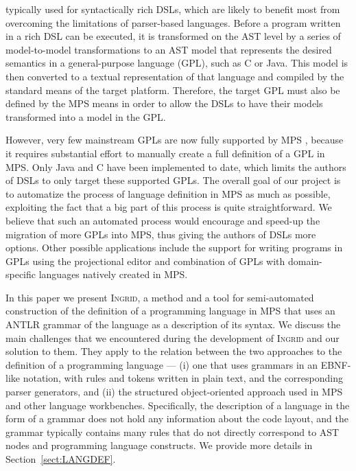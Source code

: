 
 typically used for syntactically rich DSLs, which are likely to benefit most from overcoming the limitations of parser-based languages.
Before a program written in a rich DSL can be executed, it is  transformed on the AST level by a series of model-to-model transformations to an AST model that represents the desired semantics in a general-purpose language (GPL), such as C or Java.
This model is then converted to a textual representation of that language and compiled by the standard means of the target platform.
Therefore, the target GPL must also be defined by the MPS means in order to allow the DSLs to have their models transformed into a model in the GPL.

However, very few mainstream GPLs are now fully supported by MPS , because it requires substantial effort to manually create a full definition of a GPL in MPS.
Only Java and C have been implemented to date, which limits the authors of DSLs to only target these supported GPLs.
The overall goal of our project is to automatize the process of language definition in MPS as much as possible, exploiting the fact that a big part of this process is quite straightforward.
We believe that such an automated process would encourage and speed-up the migration of more GPLs into MPS, thus giving the authors of DSLs more options.
Other possible applications include the support for writing programs in GPLs using the projectional editor and combination of GPLs with domain-specific languages natively created in MPS.

In this paper we present \textsc{Ingrid}, a method and a tool for semi-automated construction of the definition of a programming language in MPS that uses an ANTLR grammar of the language as a description of its syntax.
We discuss the main challenges that we encountered during the development of \textsc{Ingrid} and our solution to them.
They apply to the relation between the two approaches to the definition of a programming language --- (i) one that uses grammars in an EBNF-like notation, with rules and tokens written in plain text, and the corresponding parser generators, and (ii) the structured object-oriented approach used in MPS and other language workbenches.
Specifically, the description of a language in the form of a grammar does not hold any information about the code layout, and the grammar typically contains many rules that do not directly correspond to AST nodes and programming language constructs.
We provide more details in Section~\ref{sect:LANGDEF}.

